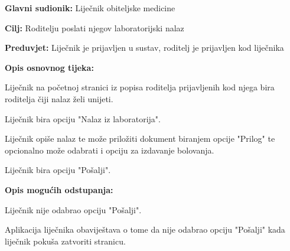 					\noindent {}
					\begin{packed_item}
						
						\item \textbf{Glavni sudionik: }Liječnik obiteljske medicine
						\item  \textbf{Cilj:} Roditelju poslati njegov laboratorijski nalaz 
						\item  \textbf{Preduvjet:} Liječnik je prijavljen u sustav, roditelj je prijavljen kod liječnika
						\item  \textbf{Opis osnovnog tijeka:}
						
						\item[] \begin{packed_enum}
							
							\item Liječnik na početnoj stranici iz popisa roditelja prijavljenih kod njega bira roditelja čiji nalaz želi unijeti.
							\item Liječnik bira opciju "Nalaz iz laboratorija".
							\item Liječnik opiše nalaz te može priložiti dokument biranjem opcije "Prilog" te opcionalno može odabrati i opciju za izdavanje bolovanja.
							\item Liječnik bira opciju "Pošalji".
						\end{packed_enum}
						
						\item  \textbf{Opis mogućih odstupanja:}
						
						\item[] \begin{packed_item}
							
							\item[4.a] Liječnik nije odabrao opciju "Pošalji".
							\item[] \begin{packed_enum}
								
								\item Aplikacija liječnika obaviještava o tome da nije odabrao opciju "Pošalji" kada liječnik pokuša zatvoriti stranicu.
							\end{packed_enum}
							
							
						\end{packed_item}
						
						
					\end{packed_item}
					
